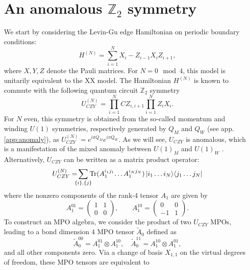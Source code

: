 \documentclass[prx, twocolumn, superscriptaddress, dvipsnames]{revtex4-2}
\theoremstyle{definition}
\newcommand{\tr}{\mathrm{Tr}}
\begin{document}
\section{An anomalous $\mathbb Z_2$ symmetry}
We start by considering the Levin-Gu edge Hamiltonian \cite{levin2012braiding} on periodic boundary conditions:
\begin{equation}
    H^{(N)} = \sum_{i=1}^{N} X_i - Z_{i-1} X_i Z_{i+1},
\end{equation}
where $X,Y,Z$ denote the Pauli matrices. For $N = 0 \mod 4$, this model is unitarily equivalent to the XX model. The Hamiltonian $H^{(N)}$ is known to commute with the following quantum circuit $\mathbb Z_2$ symmetry \cite{chen2011two}
\begin{equation}
    U_{CZY}^{(N)} = \prod_{i=1}^{N} CZ_{i,i+1} \prod_{i=1}^{N} Z_i X_i.
\end{equation}
For $N$ even, this symmetry is obtained from the so-called momentum and winding $U(1)$ symmetries, respectively generated by $Q_M$ and $Q_W$ (see app. \ref{app:anomaly}), as $U_{CZY}^{(N)} = e^{i \pi Q_M} e^{i \pi Q_W}$. As we will see, $U_{CZY}$ is anomalous, which is a manifestation of the mixed anomaly between $U(1)_M$ and $U(1)_W$ \cite{chatterjee2025quantized,pace2025lattice}. Alternatively, $U_{CZY}$ can be written as a matrix product operator:
\begin{equation}
    U_{CZY}^{(N)} = \!\!\!\! \sum_{\{i\},\{j\}} \!\!\! \tr (A_1^{i_1j_1}\!\ldots A_1^{i_{N}j_{N}}) \ket{i_1 \ldots i_{N}}\!\bra{j_1 \ldots j_{N}}
\end{equation}
where the nonzero components of the rank-4 tensor $A_1$ are given by
\begin{equation}
    A_1^{01} =
    \begin{pmatrix}
        1 & 1 \\
        0 & 0
    \end{pmatrix}, \qquad
    A_1^{10} = 
    \begin{pmatrix}
        0 & 0 \\
        -1 & 1
    \end{pmatrix}.
\end{equation}
To construct an MPO algebra, we consider the product of two $U_{CZY}$ MPOs, leading to a bond dimension 4 MPO tensor $\tilde{A}_0$ defined as
\begin{equation}
    \tilde{A}_0^{00} = A_1^{01} \otimes A_1^{10}, \quad \tilde{A}_0^{11} = A_1^{10} \otimes A_1^{01},
\end{equation}
and all other components zero. Via a change of basis $X_{1,1}$ on the virtual degrees of freedom, these MPO tensors are equivalent to
\end{document}
